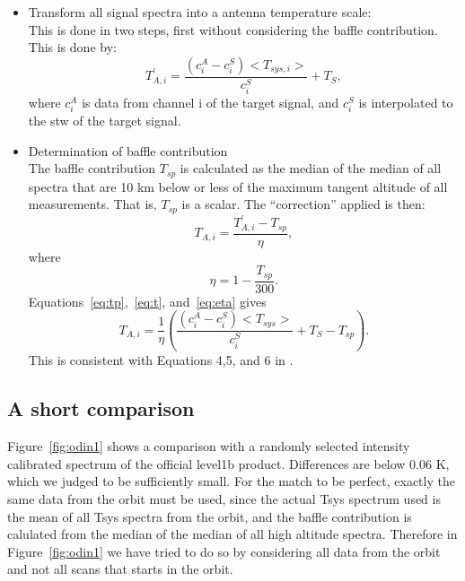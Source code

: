 \documentclass[12pt]{article}
\begin{document}
\begin{itemize}
\item Transform all signal spectra into a antenna temperature 
scale:\\
This is done in two steps, first without considering the baffle
contribution.
This is done by:
\begin{equation}
T^{'}_{A,i}=\frac{(c^{A}_{i}-c^{S}_{i})<T_{sys,i}>}{c^{S}_{i}}+T_{S},
\label{eq:tp}
\end{equation}
where \(c^{A}_{i}\) is data from channel i of the target signal,
and \(c^{S}_{i}\) is interpolated to the stw of the target signal.

\item Determination of baffle contribution\\
The baffle contribution \(T_{sp}\) is calculated as the 
median of the median of all spectra that are 10 km below or 
less of the maximum tangent altitude of all measurements.
That is, \(T_{sp}\) is a scalar. 
The ``correction'' applied is then:
\begin{equation}
T_{A,i}=\frac{T^{'}_{A,i}-T_{sp}}{\eta},
\label{eq:t}
\end{equation}
where 
\begin{equation}
\eta=1-\frac{T_{sp}}{300}.
\label{eq:eta}
\end{equation}
Equations~\ref{eq:tp},~\ref{eq:t}, and~\ref{eq:eta}  gives
\begin{equation}
T_{A,i}=\frac{1}{\eta}\left(\frac{(c^{A}_{i}-c^{S}_{i})<T_{sys}>}{c_{i}^{S}}+T_{S}-T_{sp}\right).
\end{equation}
This is consistent with Equations 4,5, and 6 in \cite{notes}. 
\end{itemize}

\subsection{A short comparison} 
Figure~\ref{fig:odin1} shows a comparison with a randomly 
selected intensity calibrated spectrum of the official
level1b product. Differences are below 0.06 K,
which we judged to be sufficiently small.
For the match to be perfect, exactly the same data 
from the orbit must be used, since the actual Tsys spectrum 
used is the mean of all Tsys spectra from the orbit,
and the baffle contribution is calulated from the median
of the median of all high altitude spectra. 
Therefore in Figure~\ref{fig:odin1}
we have tried to do so by considering all data from the
orbit and not all scans that starts in the orbit.
\end{document}
